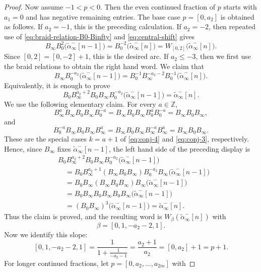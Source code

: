 \documentclass[11pt,a4paper,reqno]{amsart}%
\theoremstyle{plain}
\theoremstyle{definition}
\numberwithin{equation}{section}
\numberwithin{equation}{section}
\def\ZZ{\mathbb{Z}}
\begin{document}
\begin{proof}
Now assume $-1<p<0$. Then the even continued fraction of $p$ starts with
$a_1=0$ and has negative remaining entries. The base case
$p=[0,a_2]$ is obtained as follows. If $a_2=-1$, this is the preceding
calculation. If $a_2=-2$, then repeated use of
\eqref{eq:braid-relation-B0-Binfty} and \eqref{eq:central-shift} gives
\[
B_\infty B_0^2\bigl(\widetilde{\alpha}_\infty^-[n-1]\bigr)
=B_0^{-2}\bigl(\widetilde{\alpha}_\infty^-[n]\bigr)
=W_{[0,2]}\bigl(\widetilde{\alpha}_\infty^-[n]\bigr).
\]
Since $[0,2]=[0,-2]+1$, this is the desired arc.
If $a_2\le -3$, then
we first use the braid relations to obtain the right hand word. We claim that
\[
B_\infty B_0^{-a_2}\bigl(\widetilde{\alpha}_\infty^-[n-1]\bigr)
=B_0^{-1}B_\infty^{-a_2-2}B_0^{-1}
\bigl(\widetilde{\alpha}_\infty^-[n]\bigr).
\]
Equivalently, it is enough to prove
\[
B_0B_\infty^{a_2+2}B_0B_\infty B_0^{-a_2}
\bigl(\widetilde{\alpha}_\infty^-[n-1]\bigr)
=\widetilde{\alpha}_\infty^-[n].
\]
We use the following elementary claim. For every $a\in\ZZ$,
\[
B_\infty^aB_\infty B_0B_\infty B_0^{-a}
=B_\infty B_0B_\infty B_0^aB_0^{-a}
=B_\infty B_0B_\infty,
\]
and
\[
B_0^{-a}B_\infty B_0B_\infty B_\infty^a
=B_\infty B_0B_\infty B_\infty^{-a}B_\infty^a
=B_\infty B_0B_\infty.
\]
These are the special cases $k=a+1$ of \eqref{eq:conj-4} and \eqref{eq:conj-3}, respectively.
Hence, since $B_\infty$ fixes
$\widetilde{\alpha}_\infty^-[n-1]$, the left hand side of the preceding display
is
\[
\begin{aligned}
&B_0B_\infty^{a_2+2}B_0B_\infty B_0^{-a_2}
\bigl(\widetilde{\alpha}_\infty^-[n-1]\bigr)\\
&\quad =
B_0B_\infty^{a_2+1}(B_\infty B_0B_\infty)B_0^{-a_2}B_\infty
\bigl(\widetilde{\alpha}_\infty^-[n-1]\bigr)\\
&\quad =
B_0B_\infty (B_\infty B_0B_\infty)B_\infty
\bigl(\widetilde{\alpha}_\infty^-[n-1]\bigr)\\
&\quad =
B_0B_\infty B_0B_\infty B_0B_\infty
\bigl(\widetilde{\alpha}_\infty^-[n-1]\bigr)\\
&\quad =
(B_0B_\infty)^3
\bigl(\widetilde{\alpha}_\infty^-[n-1]\bigr)
=\widetilde{\alpha}_\infty^-[n].
\end{aligned}
\]
Thus the claim is proved, and the resulting word is
$W_{\beta}(\widetilde{\alpha}_\infty^-[n])$ with
\[
\beta=[0,1,-a_2-2,1].
\]
Now we identify this slope:
\[
[0,1,-a_2-2,1]
=\frac{1}{1+\frac{1}{-a_2-1}}
=\frac{a_2+1}{a_2}
=[0,a_2]+1
=p+1.
\]
For longer continued fractions, %
 let $p=[0,a_2,\ldots,a_{2m}]$ with

\end{proof}
\end{document}
